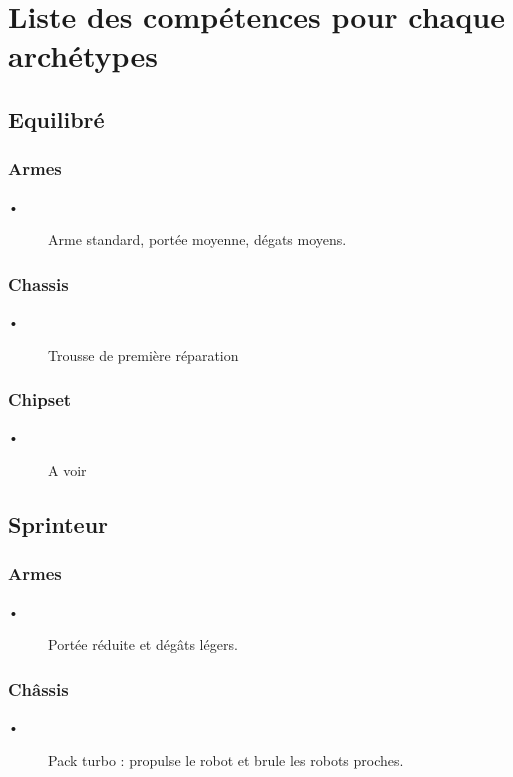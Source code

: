 \documentclass[10pt]{article}
\begin{document}
\section{Liste des compétences pour chaque archétypes}

\subsection{Equilibré}
\subsubsection*{Armes}
\begin{description}
\item [•]Arme standard, portée moyenne, dégats moyens.
\end{description}

\subsubsection*{Chassis}
\begin{description}
\item [•] Trousse de première réparation
\end{description}

\subsubsection*{Chipset}
\begin{description}
\item [•]A voir
\end{description}

\subsection{Sprinteur}
\subsubsection*{Armes}
\begin{description}
\item [•] Portée réduite et dégâts légers.
\end{description}

\subsubsection*{Châssis}
\begin{description}
\item [•] Pack turbo : propulse le robot et brule les robots proches.
\end{description}
\end{document}
